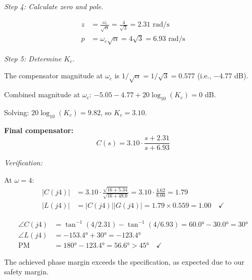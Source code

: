 \begin{examplebox}
\textit{Step 4: Calculate zero and pole.}

\begin{align}
z &= \frac{\omega_c}{\sqrt{\alpha}} = \frac{4}{\sqrt{3}} = 2.31 \text{ rad/s} \\
p &= \omega_c \sqrt{\alpha} = 4\sqrt{3} = 6.93 \text{ rad/s}
\end{align}

\textit{Step 5: Determine $K_c$.}

The compensator magnitude at $\omega_c$ is $1/\sqrt{\alpha} = 1/\sqrt{3} = 0.577$ (i.e., $-4.77$ dB).

Combined magnitude at $\omega_c$: $-5.05 - 4.77 + 20\log_{10}(K_c) = 0$ dB.

Solving: $20\log_{10}(K_c) = 9.82$, so $K_c = 3.10$.

\textbf{Final compensator:}
\[
\boxed{C(s) = 3.10 \cdot \frac{s + 2.31}{s + 6.93}}
\]

\textit{Verification:}

At $\omega = 4$:
\begin{align}
|C(j4)| &= 3.10 \cdot \frac{\sqrt{16 + 5.34}}{\sqrt{16 + 48.0}} = 3.10 \cdot \frac{4.62}{8.00} = 1.79 \\
|L(j4)| &= |C(j4)||G(j4)| = 1.79 \times 0.559 = 1.00 \quad \checkmark
\end{align}

\begin{align}
\angle C(j4) &= \tan^{-1}(4/2.31) - \tan^{-1}(4/6.93) = 60.0° - 30.0° = 30° \\
\angle L(j4) &= -153.4° + 30° = -123.4° \\
\text{PM} &= 180° - 123.4° = 56.6° > 45° \quad \checkmark
\end{align}

The achieved phase margin exceeds the specification, as expected due to our safety margin.
\end{examplebox}


